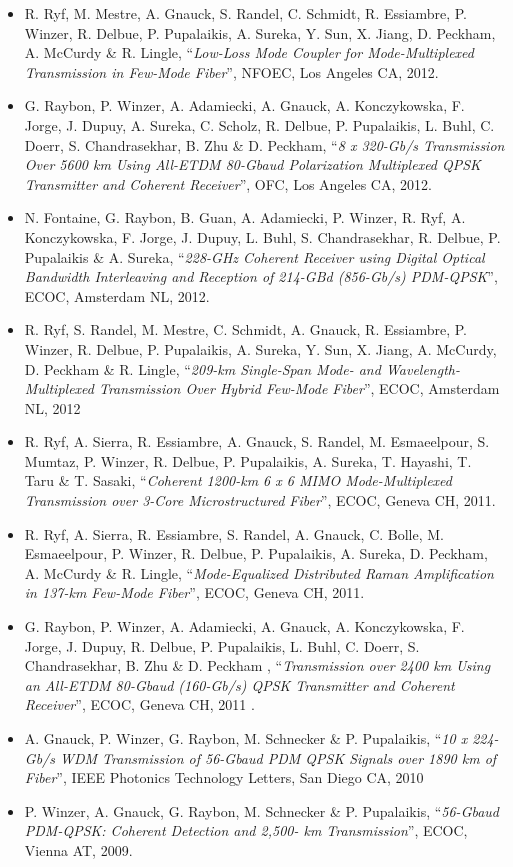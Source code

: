 \documentclass[10pt,letterpaper]{extarticle}
\newenvironment{indentsection}[1]%
{\begin{list}{}%
	{\setlength{\leftmargin}{#1}}%
	\item[]%
}
{\end{list}}
\begin{document}
\begin{indentsection}{-1em}
\begin{itemize}
\item R. Ryf, M. Mestre, A. Gnauck, S. Randel, C. Schmidt, R. Essiambre, P. Winzer, R. Delbue, P. Pupalaikis, A. Sureka, Y. Sun, X. Jiang, D. Peckham, A. McCurdy \& R. Lingle, “\emph{Low-Loss Mode Coupler for Mode-Multiplexed Transmission in Few-Mode Fiber}”, NFOEC, Los Angeles CA, 2012.
\item G. Raybon, P. Winzer, A. Adamiecki, A. Gnauck, A. Konczykowska, F. Jorge, J. Dupuy, A. Sureka, C. Scholz, R. Delbue, P. Pupalaikis, L. Buhl, C. Doerr, S. Chandrasekhar, B. Zhu \& D. Peckham, “\emph{8 x 320-Gb/s Transmission Over 5600 km Using All-ETDM 80-Gbaud Polarization Multiplexed QPSK Transmitter and Coherent Receiver}”, OFC, Los Angeles CA, 2012.
\item N. Fontaine, G. Raybon, B. Guan, A. Adamiecki, P. Winzer, R. Ryf, A. Konczykowska, F. Jorge, J. Dupuy, L. Buhl, S. Chandrasekhar, R. Delbue, P. Pupalaikis \& A. Sureka, “\emph{228-GHz Coherent Receiver using Digital Optical Bandwidth Interleaving and Reception of 214-GBd (856-Gb/s) PDM-QPSK}”, ECOC, Amsterdam NL, 2012.
\item R. Ryf, S. Randel, M. Mestre, C. Schmidt, A. Gnauck, R. Essiambre, P. Winzer, R. Delbue, P. Pupalaikis, A. Sureka, Y. Sun, X. Jiang, A. McCurdy, D. Peckham \& R. Lingle, “\emph{209-km Single-Span Mode- and Wavelength-Multiplexed Transmission Over Hybrid Few-Mode Fiber}”, ECOC, Amsterdam NL, 2012
\item R. Ryf, A. Sierra, R. Essiambre, A. Gnauck, S. Randel, M. Esmaeelpour, S. Mumtaz, P. Winzer, R. Delbue, P. Pupalaikis, A. Sureka, T. Hayashi, T. Taru \& T. Sasaki, “\emph{Coherent 1200-km 6 x 6 MIMO Mode-Multiplexed Transmission over 3-Core Microstructured Fiber}”, ECOC, Geneva CH, 2011.
\item R. Ryf, A. Sierra, R. Essiambre, S. Randel, A. Gnauck, C. Bolle, M. Esmaeelpour, P. Winzer, R. Delbue, P. Pupalaikis, A. Sureka, D. Peckham, A. McCurdy \& R. Lingle, “\emph{Mode-Equalized Distributed Raman Amplification in 137-km Few-Mode Fiber}”, ECOC, Geneva CH, 2011. 
\item G. Raybon, P. Winzer, A. Adamiecki, A. Gnauck, A. Konczykowska, F. Jorge, J. Dupuy, R. Delbue, P. Pupalaikis, L. Buhl, C. Doerr, S. Chandrasekhar, B. Zhu \& D. Peckham , “\emph{Transmission over 2400 km Using an All-ETDM 80-Gbaud (160-Gb/s) QPSK Transmitter and Coherent Receiver}”, ECOC, Geneva CH, 2011 .
\item A. Gnauck, P. Winzer, G. Raybon, M. Schnecker \& P. Pupalaikis, “\emph{10 x 224-Gb/s WDM Transmission of 56-Gbaud PDM QPSK Signals over 1890 km of Fiber}”, IEEE Photonics Technology Letters, San Diego CA, 2010 
\item P. Winzer, A. Gnauck, G. Raybon, M. Schnecker \& P. Pupalaikis, “\emph{56-Gbaud PDM-QPSK: Coherent Detection and 2,500- km Transmission}”, ECOC, Vienna AT, 2009. 
\end{itemize}\end{indentsection}
\end{document}
